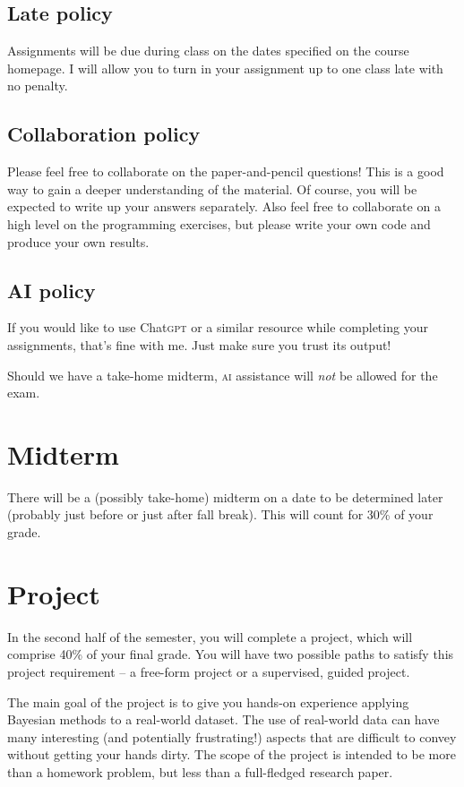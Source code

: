 \documentclass{article}
\newcommand{\acro}[1]{\textsc{\MakeLowercase{#1}}}
\begin{document}
\subsection*{Late policy}

Assignments will be due during class on the dates specified on the course
homepage.  I will allow you to turn in your assignment up to one class late with
no penalty.

\subsection*{Collaboration policy}

Please feel free to collaborate on the paper-and-pencil questions!  This is a
good way to gain a deeper understanding of the material.  Of course, you will be
expected to write up your answers separately.  Also feel free to collaborate on
a high level on the programming exercises, but please write your own code and
produce your own results.

\subsection*{AI policy}

If you would like to use Chat\acro{GPT} or a similar resource while completing
your assignments, that's fine with me. Just make sure you trust its output!

Should we have a take-home midterm, \acro{AI} assistance will \emph{not} be allowed
for the exam.

\section*{Midterm}

There will be a (possibly take-home) midterm on a date to be determined later
(probably just before or just after fall break). This will count for 30\% of your
grade.

\section*{Project}

In the second half of the semester, you will complete a project, which will
comprise 40\% of your final grade.  You will have two possible paths to satisfy
this project requirement -- a free-form project or a supervised, guided project.

The main goal of the project is to give you hands-on experience applying
Bayesian methods to a real-world dataset.  The use of real-world data can have
many interesting (and potentially frustrating!) aspects that are difficult to
convey without getting your hands dirty.  The scope of the project is intended
to be more than a homework problem, but less than a full-fledged research paper.
\end{document}
